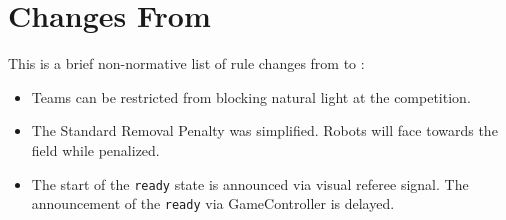 \section{Changes From \LastRCYear}

This is a brief non-normative list of rule changes from \LastRCYear to \RCYear:
\begin{itemize}
  \item Teams can be restricted from blocking natural light at the competition.
  \item The Standard Removal Penalty was simplified. Robots will face towards the field while penalized.
  \item The start of the \texttt{ready} state is announced via visual referee signal. The announcement of the \texttt{ready} via GameController is delayed.
\end{itemize}
